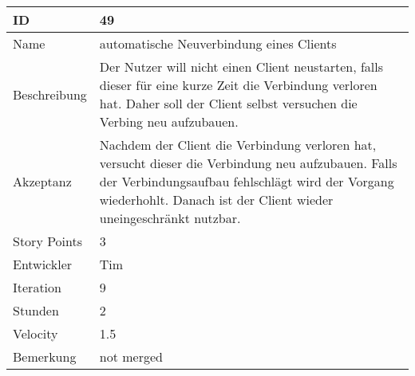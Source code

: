\begin{table}[htbp]
\begin{minipage}{\linewidth}
\setlength{\tymax}{0.5\linewidth}
\centering
\small
\begin{tabulary}{\textwidth}{|l|p{10cm}|} \hline
 ID   &49\\\hline
Name  &automatische Neuverbindung eines Clients\\\hline
Beschreibung&Der Nutzer will nicht einen Client neustarten, falls dieser für eine kurze Zeit die Verbindung verloren hat. Daher soll der Client selbst versuchen die Verbing neu aufzubauen.\\\hline
Akzeptanz &Nachdem der Client die Verbindung verloren hat, versucht dieser die Verbindung neu aufzubauen. Falls der Verbindungsaufbau fehlschlägt wird der Vorgang wiederhohlt. Danach ist der Client wieder uneingeschränkt nutzbar.\\\hline
Story Points&3\\\hline
Entwickler &Tim\\\hline
Iteration &9\\\hline
Stunden  &2\\\hline
Velocity &1.5\\\hline
Bemerkung &not merged\\\hline
\end{tabulary}
\end{minipage}
\end{table}







